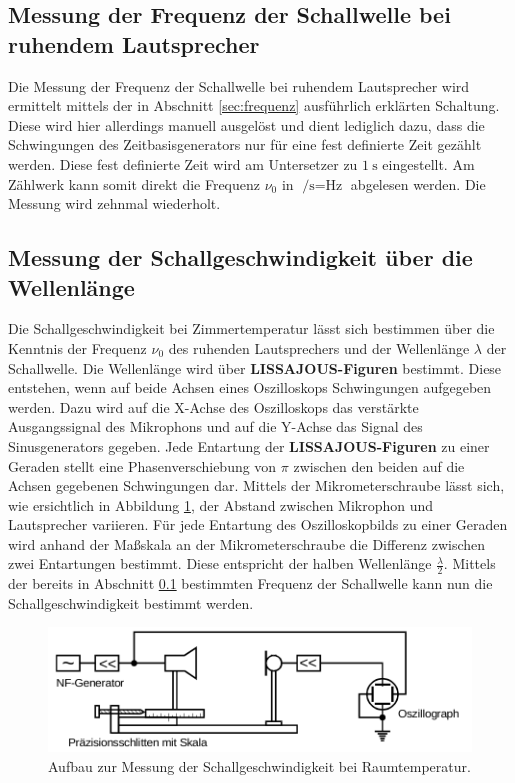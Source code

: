 \subsection{Messung der Frequenz der Schallwelle bei ruhendem Lautsprecher}
\label{sec:schall} %
Die Messung der Frequenz der Schallwelle bei ruhendem Lautsprecher wird ermittelt mittels der in Abschnitt \ref{sec:frequenz} ausführlich erklärten Schaltung.
Diese wird hier allerdings manuell ausgelöst und dient lediglich dazu, dass die Schwingungen des Zeitbasisgenerators nur für eine fest definierte Zeit gezählt werden.
Diese fest definierte Zeit wird am Untersetzer zu $\SI{1}{\second}$ eingestellt. Am Zählwerk kann somit direkt die Frequenz $\nu_{\mathrm{0}}$ in $\si{\per\second}=\si{\Hz}$ abgelesen werden.
Die Messung wird zehnmal wiederholt.
\subsection{Messung der Schallgeschwindigkeit über die Wellenlänge}
Die Schallgeschwindigkeit bei Zimmertemperatur lässt sich bestimmen über die Kenntnis der Frequenz $\nu_{\mathrm{0}}$ des ruhenden Lautsprechers und der Wellenlänge $\lambda$ der Schallwelle.
Die Wellenlänge wird über \textbf{LISSAJOUS-Figuren} bestimmt.
Diese entstehen, wenn auf beide Achsen eines Oszilloskops Schwingungen aufgegeben werden. Dazu wird auf die X-Achse des Oszilloskops das verstärkte Ausgangssignal des Mikrophons und auf die Y-Achse das Signal des Sinusgenerators gegeben.
Jede Entartung der \textbf{LISSAJOUS-Figuren} zu einer Geraden stellt eine Phasenverschiebung von $\pi$ zwischen den beiden auf die Achsen gegebenen Schwingungen dar.
Mittels der Mikrometerschraube lässt sich, wie ersichtlich in Abbildung \ref{fig:lisa}, der Abstand zwischen Mikrophon und Lautsprecher variieren.
Für jede Entartung des Oszilloskopbilds zu einer Geraden wird anhand
der Maßskala an der Mikrometerschraube die Differenz zwischen zwei Entartungen bestimmt. Diese entspricht der halben Wellenlänge $\frac{\lambda}{2}$.
Mittels der bereits in Abschnitt \ref{sec:schall} bestimmten Frequenz der Schallwelle kann nun die Schallgeschwindigkeit bestimmt werden.

\begin{figure}
	\includegraphics{Bilder/lissajou.png}
	\caption{Aufbau zur Messung der Schallgeschwindigkeit bei Raumtemperatur. \cite{Anleitung}}
	\label{fig:lisa}
\end{figure}


